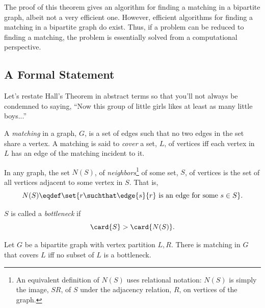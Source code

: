 The proof of this theorem gives an algorithm for finding a matching in
a bipartite graph, albeit not a very efficient one.  However,
efficient algorithms for finding a matching in a bipartite graph do
exist.  Thus, if a problem can be reduced to finding a matching, the
problem is essentially solved from a computational perspective.

\subsection{A Formal Statement}

Let's restate Hall's Theorem in abstract terms so that you'll not
always be condemned to saying, ``Now this group of little girls likes
at least as many little boys...''  


%


A \emph{matching} in a graph, $G$, is a set of edges such that no two
edges in the set share a vertex.  A matching is said to \emph{cover} a
set, $L$, of vertices iff each vertex in $L$ has an edge of the matching
incident to it.

In any graph, the set $N(S)$, of \emph{neighbors}\footnote{An equivalent
  definition of $N(S)$ uses relational notation: $N(S)$ is simply the
  image, $SR$, of $S$ under the adjacency relation, $R$, on vertices of
  the graph.} of some set, $S$, of vertices is the set of all vertices
adjacent to some vertex in $S$.  That is,
\[
N(S) \eqdef \set{r \suchthat \edge{s}{r}\text{ is an edge for some }s \in S}.
\]

$S$ is called a \emph{bottleneck} if
\[
\card{S} > \card{N(S)}.
\]

\begin{theorem}
  Let $G$ be a bipartite graph with vertex partition $L,R$.  There is
  matching in $G$ that covers $L$ iff no subset of $L$ is a bottleneck.
\end{theorem}

